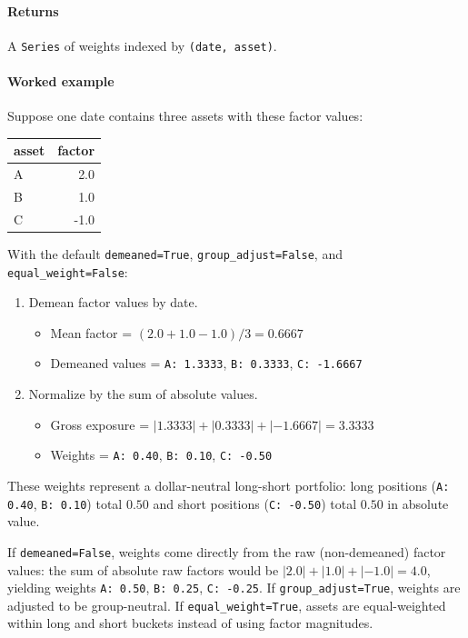 \documentclass[11pt]{article}
\begin{document}
\paragraph{Returns}
A \texttt{Series} of weights indexed by \texttt{(date, asset)}.

\paragraph{Worked example}
Suppose one date contains three assets with these factor values:

\begin{center}
\begin{tabular}{lr}
\toprule
asset & factor \\
\midrule
A & 2.0 \\
B & 1.0 \\
C & -1.0 \\
\bottomrule
\end{tabular}
\end{center}

With the default \texttt{demeaned=True}, \texttt{group\_adjust=False}, and \texttt{equal\_weight=False}:

\begin{enumerate}
  \item Demean factor values by date.
  \begin{itemize}
    \item Mean factor = \((2.0 + 1.0 - 1.0) / 3 = 0.6667\)
    \item Demeaned values = \texttt{A: 1.3333}, \texttt{B: 0.3333}, \texttt{C: -1.6667}
  \end{itemize}
  \item Normalize by the sum of absolute values.
  \begin{itemize}
    \item Gross exposure = \(|1.3333| + |0.3333| + |-1.6667| = 3.3333\)
    \item Weights = \texttt{A: 0.40}, \texttt{B: 0.10}, \texttt{C: -0.50}
  \end{itemize}
\end{enumerate}

These weights represent a dollar-neutral long-short portfolio: long positions (\texttt{A: 0.40}, \texttt{B: 0.10}) total \(0.50\) and short positions (\texttt{C: -0.50}) total \(0.50\) in absolute value.

If \texttt{demeaned=False}, weights come directly from the raw (non-demeaned) factor values: the sum of absolute raw factors would be \(|2.0| + |1.0| + |-1.0| = 4.0\), yielding weights \texttt{A: 0.50}, \texttt{B: 0.25}, \texttt{C: -0.25}. If \texttt{group\_adjust=True}, weights are adjusted to be group-neutral. If \texttt{equal\_weight=True}, assets are equal-weighted within long and short buckets instead of using factor magnitudes.
\end{document}
